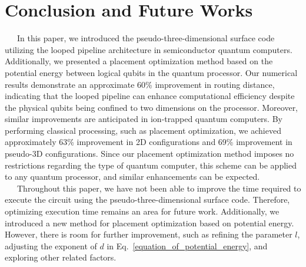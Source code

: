 \documentclass[a4paper,11pt]{ltjsarticle}
\begin{document}
\section{Conclusion and Future Works}{
    \ \ \ In this paper, we introduced the pseudo-three-dimensional surface code utilizing the looped pipeline architecture in semiconductor quantum computers. Additionally, we presented a placement optimization method based on the potential energy between logical qubits in the quantum processor. Our numerical results demonstrate an approximate 60\% improvement in routing distance, indicating that the looped pipeline can enhance computational efficiency despite the physical qubits being confined to two dimensions on the processor. Moreover, similar improvements are anticipated in ion-trapped quantum computers. By performing classical processing, such as placement optimization, we achieved approximately 63\% improvement in 2D configurations and 69\% improvement in pseudo-3D configurations. Since our placement optimization method imposes no restrictions regarding the type of quantum computer, this scheme can be applied to any quantum processor, and similar enhancements can be expected.\\
    \ \ \ Throughout this paper, we have not been able to improve the time required to execute the circuit using the pseudo-three-dimensional surface code. Therefore, optimizing execution time remains an area for future work. Additionally, we introduced a new method for placement optimization based on potential energy. However, there is room for further improvement, such as refining the parameter $l$, adjusting the exponent of $d$ in Eq.~\ref{equation_of_potential_energy}, and exploring other related factors.
}
\end{document}
